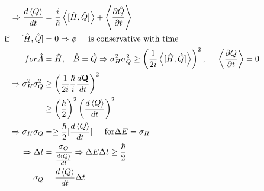 \documentclass{article}
\begin{document}
\begin{align*}
\Rightarrow \frac{d \ev{Q}}{dt}&=\frac{i}{\hbar}\ev{[\hat{H},\hat{Q}]}+\ev{\frac{\partial \hat{Q}}{\partial t}}\\
\mbox{if} \hspace{5mm}[\hat{H},\hat{Q}]&=0 \Rightarrow \phi  \hspace{5mm}\mbox{is conservative with time}\\
for \hat{A}&=\hat{H}, \hspace{3mm} \hat{B}=\hat{Q} \Rightarrow \sigma_{H}^{2} \sigma_{Q}^{2} \geq \left(\frac{1}{2i} \ev{[\hat{H},\hat{Q}]}\right)^{2}, \hspace{5mm} \ev{\frac{\partial Q}{\partial t}}=0\\
\Rightarrow \sigma_{H}^{2} \sigma_{Q}^{2} &\geq \left(\frac{1}{2i} \frac{\hbar}{i} \frac{d \vb{Q}}{dt}\right)^{2}\\
& \geq \left(\frac{\hbar}{2}\right)^{2}\left(\frac{d\ev{Q}}{dt} \right)^{2}\\
\Rightarrow \sigma_{H} \sigma_{Q} &= \geq \frac{\hbar}{2} |\frac{d \ev{Q}}{dt}| \hspace{5mm} \mbox{for} \Delta E = \sigma_{H}\\
\Rightarrow \Delta t &= \frac{\sigma_{Q}}{\frac{d\ev{Q}}{dt}} \Rightarrow \Delta E \Delta t \geq \frac{\hbar}{2}\\
\sigma_{Q} &= \frac{d \ev{Q}}{dt}\Delta t
\end{align*}
\end{document}
